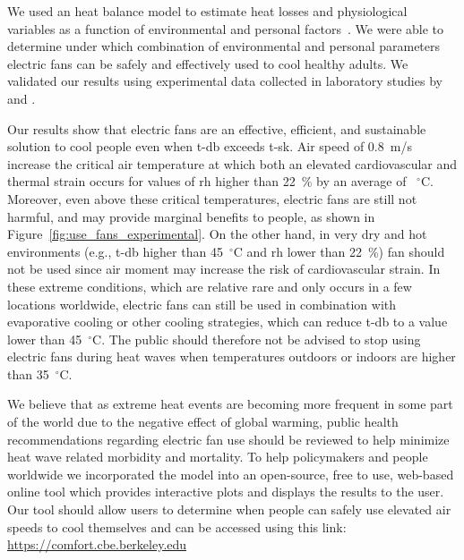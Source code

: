 We used an heat balance model to estimate heat losses and physiological variables as a function of environmental and personal factors~\cite{Gagge1986}.
We were able to determine under which combination of environmental and personal parameters electric fans can be safely and effectively used to cool healthy adults.
We validated our results using experimental data collected in laboratory studies by  and .

Our results show that electric fans are an effective, efficient, and sustainable solution to cool people even when \ac{t-db} exceeds \ac{t-sk}.
Air speed of 0.8~m/s increase the critical air temperature at which both an elevated cardiovascular and thermal strain occurs for values of \ac{rh} higher than 22~\% by an average of ~$^{\circ}$C\@.
Moreover, even above these critical temperatures, electric fans are still not harmful, and may provide marginal benefits to people, as shown in Figure~\ref{fig:use_fans_experimental}.
On the other hand, in very dry and hot environments (e.g., \ac{t-db} higher than 45~$^{\circ}$C and \ac{rh} lower than 22~\%) fan should not be used since air moment may increase the risk of cardiovascular strain.
In these extreme conditions, which are relative rare and only occurs in a few locations worldwide, electric fans can still be used in combination with evaporative cooling or other cooling strategies, which can reduce \ac{t-db} to a value lower than 45~$^{\circ}$C\@.
The public should therefore not be advised to stop using electric fans during  heat waves when temperatures outdoors or indoors are higher than 35~$^{\circ}$C\@.

We believe that as extreme heat events are becoming more frequent in some part of the world due to the negative effect of global warming, public health recommendations regarding electric fan use should be reviewed to help minimize heat wave related morbidity and mortality. 
To help policymakers and people worldwide we incorporated the model into an open-source, free to use, web-based online tool which provides interactive plots and displays the results to the user.
Our tool should allow users to determine when people can safely use elevated air speeds to cool themselves and can be accessed using this link: \url{https://comfort.cbe.berkeley.edu}